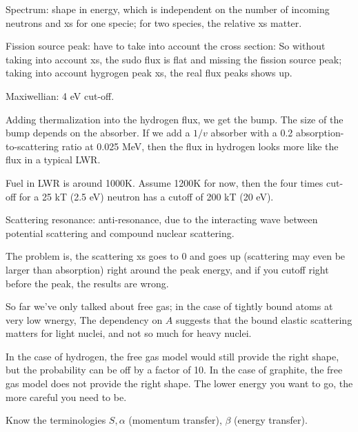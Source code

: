 \documentclass{school-22.211-notes}
\begin{document}
Spectrum: shape in energy, which is independent on the number of incoming neutrons and xs for one specie; for two species, the relative xs matter. 

Fission source peak: have to take into account the cross section: 
So without taking into account xs, the sudo flux is flat and missing the fission source peak; taking into account hygrogen peak xs, the real flux peaks shows up. 


Maxiwellian: 4 eV cut-off. 


Adding thermalization into the hydrogen flux, we get the bump. The size of the bump depends on the absorber. If we add a $1/v$ absorber with a 0.2 absorption-to-scattering ratio at 0.025 MeV, then the flux in hydrogen looks more like the flux in a typical LWR. 


Fuel in LWR is around 1000K. Assume 1200K for now, then the four times cut-off for a 25 kT (2.5 eV) neutron has a cutoff of 200 kT (20 eV). 

Scattering resonance: anti-resonance, due to the interacting wave between potential scattering and compound nuclear scattering. 

The problem is, the scattering xs goes to 0 and goes up (scattering may even be larger than absorption) right around the peak energy, and if you cutoff right before the peak, the results are wrong. 

So far we've only talked about free gas; in the case of tightly bound atoms at very low wnergy, 
The dependency on $A$ suggests that the bound elastic scattering matters for light nuclei, and not so much for heavy nuclei. 

In the case of hydrogen, the free gas model would still provide the right shape, but the probability can be off by a factor of 10. In the case of graphite, the free gas model does not provide the right shape. The lower energy you want to go, the more careful you need to be. 

Know the terminologies $S, \alpha$ (momentum transfer), $\beta$ (energy transfer). 
\end{document}
